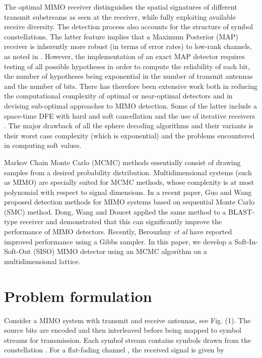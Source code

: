 \documentclass[pre,12pt,aps]{revtex4}
\begin{document}
 The optimal MIMO receiver distinguishes the 
spatial signatures of different transmit substreams 
as seen at the receiver, while fully exploiting 
available receive diversity. The detection process 
also accounts for the structure of symbol 
constellations. The latter feature implies that a 
Maximum  Posterior (MAP) receiver is inherently 
more robust (in terms of error rates) to low-rank 
channels, as noted in \cite{hsadsfh}. However, the 
implementation of an exact MAP detector requires 
testing of all possible hypotheses in order to compute 
the reliability of each bit, the number of 
hypotheses being exponential in the number 
of transmit antennas and the number of bits. 
There has therefore been extensive work both 
in reducing the computational complexity of 
optimal or near-optimal detectors \cite{bhhv,jbnslbmf,eateav}
and in devising sub-optimal approaches to 
MIMO detection. Some of the latter include a 
space-time DFE with hard \cite{pwwgjf} and soft 
cancellation\cite{wjckwcjmc} and the use of iterative 
receivers \cite{bhw,sm}. The major drawback of 
all the sphere decoding algorithms and their 
variants is their worst case complexity 
(which is exponential) and the problems encountered 
in computing soft values.

Markov Chain Monte Carlo (MCMC) methods essentially consist of
 drawing  samples 
from a desired probability distribution. Multidimensional 
systems (such as MIMO) are specially suited for MCMC methods, 
whose complexity is at most polynomial with respect to 
signal dimensions. In a recent paper, Guo and Wang \cite{gw} 
proposed detection methods for MIMO systems based on sequential 
Monte Carlo (SMC) method. Dong, Wang and Doucet \cite{dwd}
applied the same 
method to a BLAST-type receiver and demonstrated that this 
can significantly improve the performance of MIMO detectors. 
Recently, Berouzhny {\it et al} \cite{fbzs} have reported 
improved performance using a Gibbs sampler. In 
this paper, we develop a Soft-In-Soft-Out (SISO) 
MIMO detector using an MCMC algorithm on a 
multidimensional lattice. 

\section{Problem formulation}

Consider a MIMO system with transmit and  receive antennas,
see Fig. (1). The source bits are encoded and then interleaved before 
being mapped to  symbol streams for transmission.
Each symbol stream contains symbols drawn from the 
constellation . For a flat-fading channel , 
the received signal  is given by
\end{document}

